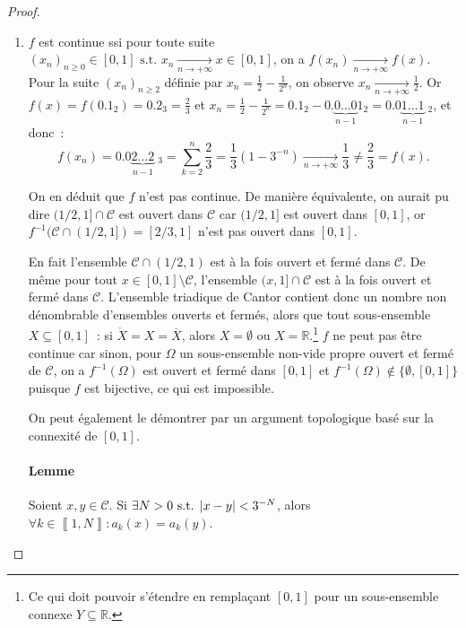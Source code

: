 \documentclass{article}
\newcommand{\pinfty}{{+\infty}}
\newcommand{\st}{\text{ s.t. }}
\newcommand{\R}{{\mathbb R}}
\newcommand{\intint}[2]{\left\llbracket#1, #2\right\rrbracket}
\begin{document}
\begin{proof}~
\begin{enumerate}
	\item $f$ est continue ssi pour toute suite $(x_n)_{n \geq 0} \in [0, 1] \st x_n \xrightarrow[n \to \pinfty]{} x \in [0, 1]$, on a $f(x_n) \xrightarrow[n \to \pinfty]{} f(x)$.
	Pour la suite $(x_n)_{n \geq 2}$ définie par $x_n = \frac 12 - \frac 1{2^n}$, on observe $x_n \xrightarrow[n \to \pinfty]{} \frac 12$. Or $f(x) = f(0.1_2) = 0.2_3 = \frac 23$ et
	$x_n = \frac 12 - \frac 1{2^n} = 0.1_2 - 0.\underbrace {0\ldots0}_{n-1}1_2 = 0.0\underbrace {1\ldots1}_{n-1}\phantom._2$, et donc~:
	\[f(x_n) = 0.0\underbrace {2\ldots2}_{n-1}\phantom._3 = \sum_{k=2}^n\frac 23 = \frac 13(1-3^{-n}) \xrightarrow[n \to \pinfty]{} \frac 13 \neq \frac 23 = f(x).\]

	On en déduit que $f$ n'est pas continue. De manière équivalente, on aurait pu dire $(1/2, 1] \cap \mathscr C$ est ouvert dans $\mathscr C$ car $(1/2, 1]$ est ouvert dans $[0, 1]$,
	or $f^{-1}(\mathscr C \cap (1/2, 1]) = [2/3, 1]$ n'est pas ouvert dans $[0, 1]$.

	En fait l'ensemble $\mathscr C \cap (1/2, 1)$ est à la fois ouvert et fermé dans $\mathscr C$. De même pour tout $x \in [0, 1] \setminus \mathscr C$, l'ensemble
	$(x, 1] \cap \mathscr C$ est à la fois ouvert et fermé dans $\mathscr C$. L'ensemble triadique de Cantor contient donc un nombre non dénombrable d'ensembles ouverts et fermés,
	alors que tout sous-ensemble $X \subseteq [0, 1]$~: si $\mathring X = X = \overline X$, alors $X = \emptyset$ ou $X = \R$.\footnote{Ce qui doit pouvoir s'étendre en remplaçant
	$[0, 1]$ pour un sous-ensemble connexe $Y \subseteq \R$.} $f$ ne peut pas être continue car sinon, pour $\Omega$ un sous-ensemble non-vide propre ouvert et fermé de $\mathscr C$,
	on a $f^{-1}(\Omega)$ est ouvert et fermé dans $[0, 1]$ et $f^{-1}(\Omega) \not \in \{\emptyset, [0, 1]\}$ puisque $f$ est bijective, ce qui est impossible.

	On peut également le démontrer par un argument topologique basé sur la connexité de $[0, 1]$.

	\paragraph {Lemme} Soient $x, y \in \mathscr C$. Si $\exists N > 0 \st \abs {x-y} < 3^{-N}$, alors $\forall k \in \intint 1N : a_k(x) = a_k(y)$.


\end{enumerate}
\end{proof}
\end{document}
